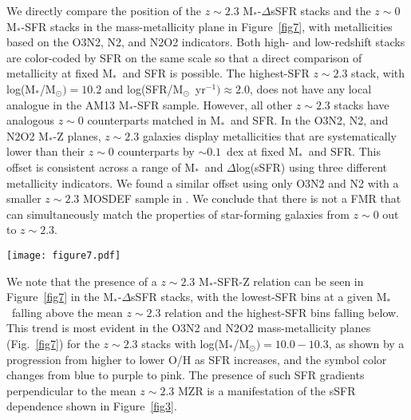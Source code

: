 \documentclass[iop,twocolappendix]{emulateapj}
\newcommand{\mstar}{$\mbox{M}_*$}
\begin{document}
We directly compare the position of the $z\sim2.3$ \mstar-$\Delta$sSFR stacks and the $z\sim0$
 \mstar-SFR stacks in the mass-metallicity plane in Figure~\ref{fig7}, with
 metallicities based on the O3N2, N2, and N2O2 indicators.
  Both high- and low-redshift stacks are color-coded by SFR on the same scale
 so that a direct comparison of metallicity at fixed \mstar\ and SFR is possible.
  The highest-SFR $z\sim2.3$ stack, with log(M$_*$/M$_{\odot})=10.2$ and
 log(SFR/M$_{\odot}$~yr$^{-1})\approx2.0$, does not have any local analogue in the AM13 \mstar-SFR
 sample.  However, all other $z\sim2.3$ stacks have analogous $z\sim0$ counterparts
 matched in \mstar\ and SFR.  In the O3N2, N2, and N2O2 \mstar-Z planes,
 $z\sim2.3$ galaxies display metallicities that are systematically lower than their $z\sim0$
 counterparts by $\sim0.1$~dex at fixed \mstar\ and SFR.  This offset is consistent across
 a range of \mstar\ and $\Delta$log(sSFR) using three different metallicity indicators.
  We found a similar offset using only O3N2 and N2 with a smaller $z\sim2.3$ MOSDEF sample in
 \citet{san15}.
  We conclude that there is not a FMR
 that can simultaneously match the properties of star-forming galaxies from $z\sim0$ out to $z\sim2.3$.

\begin{figure*}
 \texttt{[image: figure7.pdf]}
 \centering
 \caption{The mass-metallicity relation based on O3N2 (left), N2 (middle), and N2O2 (right)
 for $z\sim0$ and $z\sim2.3$ stacks, color-coded by SFR.  Colored squares indicate the $z\sim0$
 \mstar-SFR stacks of \citet{and13}.  Colored stars with error bars show the $z\sim2.3$ \mstar-$\Delta$sSFR stacks.
  Both samples are color-coded by SFR on the same scale.  The red dashed line denotes the
 best-fit $z\sim2.3$ MZR for each line ratio, given in Table~\ref{tab:bestfits}.
}\label{fig7}
\end{figure*}
 
We note that the presence of a $z\sim2.3$ \mstar-SFR-Z relation can be seen in Figure~\ref{fig7} in the
 \mstar-$\Delta$sSFR stacks, with the lowest-SFR bins at a given \mstar\ falling above the mean $z\sim2.3$
 relation and the highest-SFR bins falling below.  This trend is most evident in the
 O3N2 and N2O2 mass-metallicity planes (Fig.~\ref{fig7}) for the $z\sim2.3$ stacks with
 log(M$_*$/M$_{\odot})=10.0-10.3$, as shown by a progression from higher to lower O/H as SFR increases,
 and the symbol color changes from blue to purple to pink.
  The presence of such SFR gradients perpendicular to
 the mean $z\sim2.3$ MZR is a manifestation of the sSFR dependence shown in Figure~\ref{fig3}.
\end{document}

